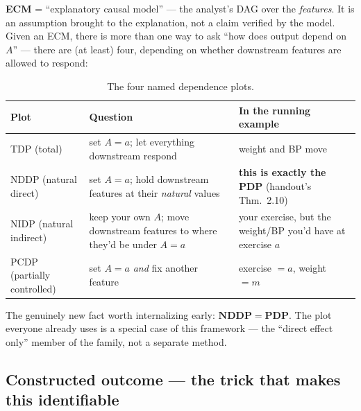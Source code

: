 \textbf{ECM} = ``explanatory causal model'' --- the analyst's DAG over the
\emph{features}. It is an assumption brought to the explanation, not a claim
verified by the model. Given an ECM, there is more than one way to ask ``how
does output depend on $A$'' --- there are (at least) four, depending on
whether downstream features are allowed to respond:

\begin{table}[h]
\centering
\begin{tabular}{@{}p{2.6cm}p{5.2cm}p{5.6cm}@{}}
\toprule
\textbf{Plot} & \textbf{Question} & \textbf{In the running example} \\
\midrule
TDP (total) & set $A=a$; let everything downstream respond &
  weight and BP move \\
NDDP (natural direct) & set $A=a$; hold downstream features at their
  \emph{natural} values & \textbf{this is exactly the PDP} (handout's
  Thm.\ 2.10) \\
NIDP (natural indirect) & keep your own $A$; move downstream features to
  where they'd be under $A=a$ & your exercise, but the weight/BP you'd have
  at exercise $a$ \\
PCDP (partially controlled) & set $A=a$ \emph{and} fix another feature &
  exercise $=a$, weight $=m$ \\
\bottomrule
\end{tabular}
\caption{The four named dependence plots.}
\label{tab:four-plots}
\end{table}

The genuinely new fact worth internalizing early: $\mathbf{NDDP = PDP}$. The
plot everyone already uses is a special case of this framework --- the
``direct effect only'' member of the family, not a separate method.

\subsection{Constructed outcome --- the trick that makes this identifiable}

